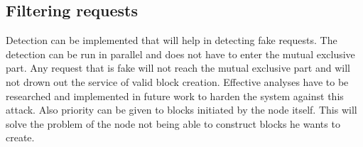 \subsection{Filtering requests}
Detection can be implemented that will help in detecting fake requests.
The detection can be run in parallel and does not have to enter the mutual exclusive part.
Any request that is fake will not reach the mutual exclusive part
and will not drown out the service of valid block creation.
Effective analyses have to be researched and implemented in future work to harden the system against this attack.
Also priority can be given to blocks initiated by the node itself.
This will solve the problem of the node not being able to construct blocks he wants to create.